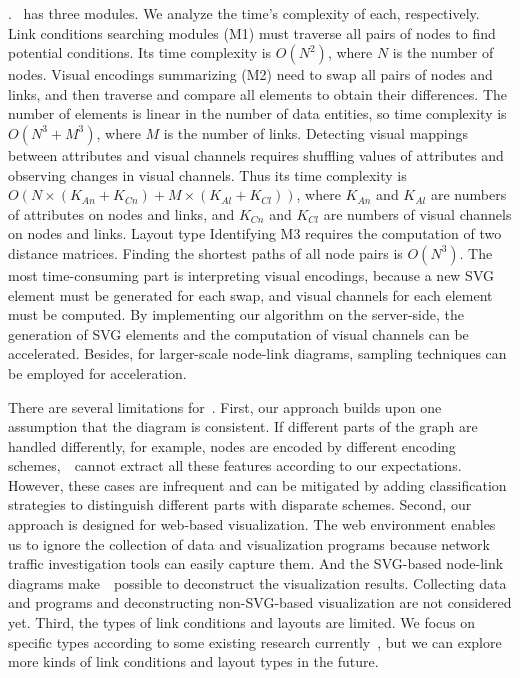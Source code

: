 .
\ApproachName~has three modules. We analyze the time's complexity of each, respectively. Link conditions searching modules (M1) must traverse all pairs of nodes to find potential conditions. Its time complexity is $O(N^2)$, where $N$ is the number of nodes.
Visual encodings summarizing (M2) need to swap all pairs of nodes and links, and then traverse and compare all elements to obtain their differences.
The number of elements is linear in the number of data entities, so time complexity is $O(N^3 + M^3)$, where $M$ is the number of links.
Detecting visual mappings between attributes and visual channels requires shuffling values of attributes and observing changes in visual channels.
Thus its time complexity is $O(N \times (K_{An} + K_{Cn}) + M \times  (K_{Al} + K_{Cl}))$, where $K_{An}$ and $K_{Al}$ are numbers of attributes on nodes and links, and $K_{Cn}$ and $K_{Cl}$ are numbers of visual channels on nodes and links.
Layout type Identifying M3 requires the computation of two distance matrices.
Finding the shortest paths of all node pairs is $O(N^3)$.
The most time-consuming part is interpreting visual encodings, because a new SVG element must be generated for each swap, and visual channels for each element must be computed.
By implementing our algorithm on the server-side,
the generation of SVG elements and the computation of visual channels can be accelerated.
Besides, for larger-scale node-link diagrams, sampling techniques can be employed for acceleration.

There are several limitations for~\ApproachName.
First, our approach builds upon one assumption that the diagram is consistent. If different parts of the graph are handled differently, for example, nodes are encoded by different encoding schemes,~\ApproachName~cannot extract all these features according to our expectations. 
However, these cases are infrequent and can be mitigated by adding classification strategies to distinguish different parts with disparate schemes.
Second, our approach is designed for web-based visualization. The web environment enables us to ignore the collection of data and visualization programs because network traffic investigation tools can easily capture them. And the SVG-based node-link diagrams make~\ApproachName~possible to deconstruct the visualization results.
Collecting data and programs and deconstructing non-SVG-based visualization are not considered yet.
Third, the types of link conditions and layouts are limited. We focus on specific types according to some existing research currently~\cite{DBLP:journals/tvcg/SrinivasanPEB18, DBLP:conf/ieeevast/BigelowNML19, DBLP:journals/cgf/NobreMSL19}, but we can explore more kinds of link conditions and layout types in the future.